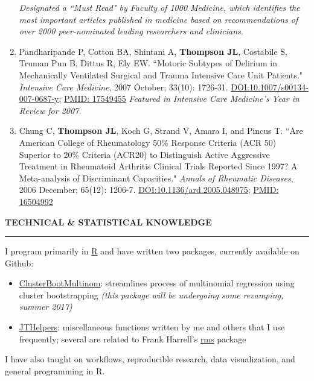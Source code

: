 \documentclass[5pt]{article}
\begin{document}
\begin{enumerate}
    \emph{Designated a ``Must Read" by Faculty of 1000 Medicine, which identifies the most important articles published in medicine based on recommendations of over 2000 peer-nominated leading researchers and clinicians.}
\item Pandharipande P, Cotton BA, Shintani A, \textbf{Thompson JL}, Costabile S, Truman Pun B, Dittus R, Ely EW. ``Motoric Subtypes of Delirium in Mechanically Ventilated Surgical and Trauma Intensive Care Unit Patients." \emph{Intensive Care Medicine}, 2007 October; 33(10): 1726-31. \href{https://doi.org/10.1007/s00134-007-0687-y}{DOI:10.1007/s00134-007-0687-y}; \href{https://www.ncbi.nlm.nih.gov/pubmed/17549455}{PMID: 17549455} \emph{Featured in Intensive Care Medicine's Year in Review for 2007.}
\item Chung C, \textbf{Thompson JL}, Koch G, Strand V, Amara I, and Pincus T. ``Are American College of Rheumatology 50\% Response Criteria (ACR 50) Superior to 20\% Criteria (ACR20) to Distinguish Active Aggressive Treatment in Rheumatoid Arthritis Clinical Trials Reported Since 1997? A Meta-analysis of Discriminant Capacities." \emph{Annals of Rheumatic Diseases}, 2006 December; 65(12): 1206-7. \href{https://doi.org/10.1136/ard.2005.048975}{DOI:10.1136/ard.2005.048975}; \href{https://www.ncbi.nlm.nih.gov/pubmed/16504992}{PMID: 16504992}
\end{enumerate}

\noindent \linebreak \textbf{TECHNICAL \& STATISTICAL KNOWLEDGE}\\
\rule[5pt]{\linewidth}{1.0pt}
\noindent I program primarily in \href{http://www.r-project.org}{R} and have written two packages, currently available on Github:
\begin{itemize}
\item \href{https://github.com/jenniferthompson/ClusterBootMultinom}{ClusterBootMultinom}: streamlines process of multinomial regression using cluster bootstrapping \emph{(this package will be undergoing some revamping, summer 2017)}
\item \href{https://github.com/jenniferthompson/JTHelpers}{JTHelpers}: miscellaneous functions written by me and others that I use frequently; several are related to Frank Harrell's \href{https://cran.r-project.org/web/packages/rms/index.html}{rms} package
\end{itemize}

\noindent I have also taught on workflows, reproducible research, data
visualization, and general programming in R.\\
\end{document}
